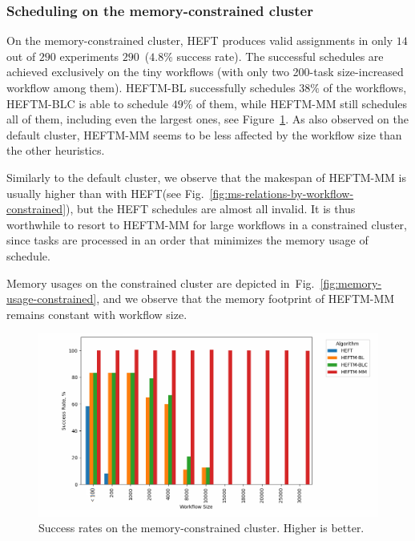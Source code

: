 \documentclass[conference]{IEEEtran}
\newcommand{\algo}[1]{\textsc{#1}}
\newcommand{\heft}{\algo{HEFT}\xspace}
\newcommand{\heftmm}{\algo{HEFTM-MM}\xspace}
\newcommand{\heftbl}{\algo{HEFTM-BL}\xspace}
\newcommand{\heftblc}{\algo{HEFTM-BLC}\xspace}
\begin{document}
\subsubsection{Scheduling on the memory-constrained cluster}
\label{ss:mem-constrained-cluster}
%
On the memory-constrained cluster, \heft produces valid assignments in only $14$ out of $290$ experiments
$290$~($4.8\%$ success rate).
The successful schedules are achieved exclusively on the tiny workflows (with only two 200-task size-increased
workflow among them).
\heftbl successfully schedules $38\%$ of the workflows, \heftblc is able to schedule $49\%$ of them, while \heftmm
still schedules all of them, including even the largest ones, see Figure~\ref{fig:success-rates-tiny}.
As also observed on the default cluster, \heftmm seems to be less affected by the workflow size
than the other heuristics.

Similarly to the default cluster, we observe that the makespan of \heftmm is usually higher
than with \heft (see Fig.~\ref{fig:ms-relations-by-workflow-constrained}), but the \heft schedules are
almost all invalid. It is thus worthwhile to resort to \heftmm for large workflows
in a constrained cluster, since tasks are processed in an order that minimizes
the memory usage of schedule.
%
%
%

Memory usages on the constrained cluster are depicted in~Fig.~\ref{fig:memory-usage-constrained},
and we observe that the memory footprint of \heftmm remains constant with workflow size.


\begin{figure}[tb]
    \centering
    \includegraphics[width=1\columnwidth] {images/success-rates-tiny}
    \caption{Success rates on the memory-constrained cluster. Higher is better. }
    \label{fig:success-rates-tiny}
    \vspace{-0.15cm}
\end{figure}
\end{document}
